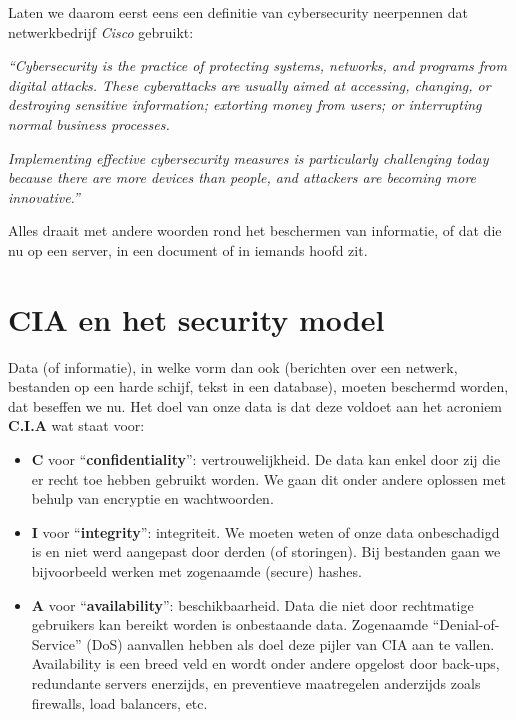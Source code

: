 \documentclass[
  10pt,
  dutch,
  paper=a4,
  ,captions=tableheading
]{scrbook}
\providecommand{\tightlist}{%
  \setlength{\itemsep}{0pt}\setlength{\parskip}{0pt}}
\begin{document}
Laten we daarom eerst eens een definitie van cybersecurity neerpennen
dat netwerkbedrijf \emph{Cisco} gebruikt:

\emph{``Cybersecurity is the practice of protecting systems, networks,
and programs from digital attacks. These cyberattacks are usually aimed
at accessing, changing, or destroying sensitive information; extorting
money from users; or interrupting normal business processes.}

\emph{Implementing effective cybersecurity measures is particularly
challenging today because there are more devices than people, and
attackers are becoming more innovative.''}

Alles draait met andere woorden rond het beschermen van informatie, of
dat die nu op een server, in een document of in iemands hoofd zit.

\section{CIA en het security model}\label{cia-en-het-security-model}

Data (of informatie), in welke vorm dan ook (berichten over een netwerk,
bestanden op een harde schijf, tekst in een database), moeten beschermd
worden, dat beseffen we nu. Het doel van onze data is dat deze voldoet
aan het acroniem \textbf{C.I.A} wat staat voor:

\begin{itemize}
\tightlist
\item
  \textbf{C} voor ``\textbf{confidentiality}'': vertrouwelijkheid. De
  data kan enkel door zij die er recht toe hebben gebruikt worden. We
  gaan dit onder andere oplossen met behulp van encryptie en
  wachtwoorden.
\item
  \textbf{I} voor ``\textbf{integrity}'': integriteit. We moeten weten
  of onze data onbeschadigd is en niet werd aangepast door derden (of
  storingen). Bij bestanden gaan we bijvoorbeeld werken met zogenaamde
  (secure) hashes.
\item
  \textbf{A} voor ``\textbf{availability}'': beschikbaarheid. Data die
  niet door rechtmatige gebruikers kan bereikt worden is onbestaande
  data. Zogenaamde ``Denial-of-Service'' (DoS) aanvallen hebben als doel
  deze pijler van CIA aan te vallen. Availability is een breed veld en
  wordt onder andere opgelost door back-ups, redundante servers
  enerzijds, en preventieve maatregelen anderzijds zoals firewalls, load
  balancers, etc.
\end{itemize}
\end{document}
